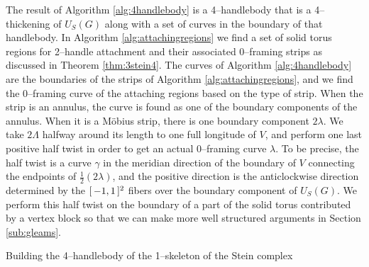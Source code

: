 The result of Algorithm \ref{alg:4handlebody} is a 4--handlebody that is a 4--thickening of $U_S(G)$ along with a set of curves in the boundary of that handlebody.
In Algorithm \ref{alg:attachingregions} we find a set of solid torus regions for 2--handle attachment and their associated 0--framing strips as discussed in Theorem \ref{thm:3stein4}.
The curves of Algorithm \ref{alg:4handlebody} are the boundaries of the strips of Algorithm \ref{alg:attachingregions}, and we find the 0--framing curve of the attaching regions based on the type of strip.
When the strip is an annulus, the curve is found as one of the boundary components of the annulus.
When it is a M\"obius strip, there is one boundary component $2\lambda$.
We take $2\Lambda$ halfway around its length to one full longitude of $V$, and perform one last positive half twist in order to get an actual 0--framing curve $\lambda$.
To be precise, the half twist is a curve $\gamma$ in the meridian direction of the boundary of $V$ connecting the endpoints of $\frac{1}{2}(2\lambda)$, and the positive direction is the anticlockwise direction determined by the $[\,-1,1\,]^2$ fibers over the boundary component of $U_S(G)$.
We perform this half twist on the boundary of a part of the solid torus contributed by a vertex block so that we can make more well structured arguments in Section \ref{sub:gleams}.

\begin{algorithm}
	\caption{Building the 4--handlebody of the 1--skeleton of the Stein complex}
	\label{alg:4handlebody}
\end{algorithm}		
		
